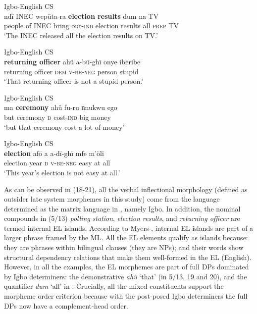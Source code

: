 \documentclass[output=paper]{langsci/langscibook}
\begin{document}
\ea
{Igbo-English CS}\\
\gll ndï    INEC  wepüta-ra  \textbf{election results}   dum  na  TV\\
     people of  INEC  bring out-\textsc{ind}   election results  all  \textsc{prep}  TV\\
\glt ‘The INEC released all the election results on TV.’    
\z

\ea
{Igbo-English CS}\\
\gll \textbf{returning officer  }ahü       a-bü-ghï        onye    iberibe\\
     returning officer     \textsc{dem}  \textsc{v-be-neg}  person  stupid\\
\glt ‘That returning officer is not a stupid person.’
\z

\ea
{Igbo-English CS}\\
\gll ma  \textbf{ceremony   }ahü  fu-ru      n̩nukwu   ego\\
     but ceremony  \textsc{d}  cost-\textsc{ind}  big    money\\
\glt ‘but that ceremony cost a lot of money’
\z

\ea
{Igbo-English CS}\\
\gll \textbf{election  }afö  a  a-dï-ghï  mfe  m’ölï\\
     election    year  \textsc{d}  \textsc{v-be-neg}  easy  at all\\
\glt ‘This year’s election is not easy at all.’
\z

As can be observed in (18-21), all the verbal inflectional morphology (defined as outsider late system morphemes in this study) come from the language determined as the matrix language in , namely Igbo. In addition, the nominal compounds in (5/13) \textit{polling}\textbf{\textit{ }}\textit{station},  \textit{election results}, and  \textit{returning officer }are termed internal EL islands. According to Myers-\citet[265]{Scotton2006}, internal EL islands are part of a larger phrase framed by the ML. All the EL elements qualify as islands because: they are phrases within bilingual clauses (they are NPs); and their words show structural dependency relations that make them well-formed in the EL (English). However, in all the examples, the EL morphemes are part of full DPs dominated by Igbo determiners: the demonstrative \textit{ahü} ‘that’ (in 5/13, 19 and 20), and the quantifier \textit{dum }‘all’ in . Crucially, all the mixed constituents support the morpheme order criterion because with the post-posed Igbo determiners the full DPs now have a complement-head order. 
\end{document}
